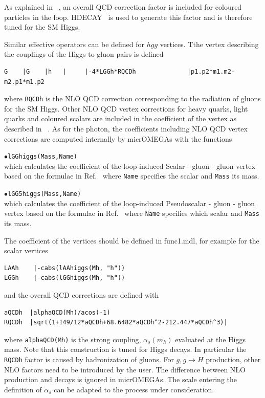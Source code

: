 \documentclass[12pt,a4paper]{article}
\begin{document}
As explained in ~\cite{Belanger:2013oya,Belyaev:2012qa}, an overall  QCD correction factor is included for coloured particles in the loop. HDECAY~\cite{Djouadi:1997yw} is used to generate this factor and is therefore tuned for the SM Higgs.

Similar effective operators can be defined for $hgg$ vertices.  Tthe vertex describing the couplings of the Higgs to gluon pairs is defined
\begin{verbatim}
G    |G    |h   |     |-4*LGGh*RQCDh              |p1.p2*m1.m2-m2.p1*m1.p2
\end{verbatim}
where {\tt RQCDh} is the NLO QCD correction corresponding to the radiation of gluons for the SM Higgs. Other NLO QCD vertex corrections for heavy quarks, light quarks and coloured scalars are included in the coefficient of the vertex as described in ~\cite{Belanger:2013oya,Belyaev:2012qa}.
As for the photon, the coefficients  including NLO QCD vertex corrections are computed internally by micrOMEGAs with the functions

\noindent
$\bullet$\verb|lGGhiggs(Mass,Name)|\\
which calculates the coefficient of the loop-induced  Scalar - gluon - gluon  vertex based on the formulae in Ref.~\cite{Djouadi:2005gi} where {\tt Name} specifies the  scalar and {\tt Mass} its mass. 

\noindent
$\bullet$\verb|lGG5higgs(Mass,Name)|\\
which calculates the coefficient of the loop-induced  Pseudoscalar - gluon - gluon  vertex based on the formulae in Ref.~\cite{Djouadi:2005gi} where {\tt Name} specifies which scalar and {\tt Mass} its mass. 


The coefficient of the vertices should be defined in func1.mdl, for example for the scalar vertices
 \begin{verbatim}
LAAh    |-cabs(lAAhiggs(Mh, "h"))
LGGh    |-cabs(lGGhiggs(Mh, "h"))
\end{verbatim}
and the overall QCD corrections are defined with 

 \begin{verbatim}
aQCDh  |alphaQCD(Mh)/acos(-1)
RQCDh  |sqrt(1+149/12*aQCDh+68.6482*aQCDh^2-212.447*aQCDh^3)|
\end{verbatim}
where {\tt alphaQCD(Mh)} is the strong coupling, $\alpha_s(m_h)$ evaluated at the Higgs mass. Note that this construction is tuned for  Higgs decays. In particular the   \verb|RQCDh|  factor is caused by hadronization of gluons.   For $g,g\to H$ production, other NLO factors need to be introduced by the user. The difference between NLO production and decays is ignored in micrOMEGAs.  The scale entering the definition of $\alpha_s$ can be adapted to the process under consideration. 
\end{document}
